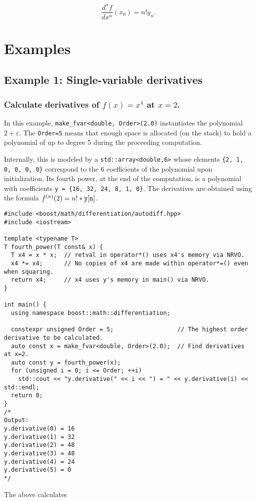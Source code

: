 \documentclass{article}
\begin{document}
\[ \frac{d^nf}{dx^n}(x_0)=n!y_n. \]

\section{Examples}

\subsection{Example 1: Single-variable derivatives}

\subsubsection{Calculate derivatives of $f(x)=x^4$ at $x=2$.}

In this example, {\tt make\_fvar<double, Order>(2.0)} instantiates the polynomial $2+\varepsilon$. The {\tt Order=5}
means that enough space is allocated (on the stack) to hold a polynomial of up to degree 5 during the proceeding
computation.

Internally, this is modeled by a {\tt std::array<double,6>} whose elements {\tt \{2, 1, 0, 0, 0, 0\}} correspond
to the 6 coefficients of the polynomial upon initialization. Its fourth power, at the end of the computation, is
a polynomial with coefficients {\tt y = \{16, 32, 24, 8, 1, 0\}}.  The derivatives are obtained using the formula
$f^{(n)}(2)=n!*{\tt y[n]}$.

\begin{verbatim}
#include <boost/math/differentiation/autodiff.hpp>
#include <iostream>

template <typename T>
T fourth_power(T const& x) {
  T x4 = x * x;  // retval in operator*() uses x4's memory via NRVO.
  x4 *= x4;      // No copies of x4 are made within operator*=() even when squaring.
  return x4;     // x4 uses y's memory in main() via NRVO.
}

int main() {
  using namespace boost::math::differentiation;

  constexpr unsigned Order = 5;                  // The highest order derivative to be calculated.
  auto const x = make_fvar<double, Order>(2.0);  // Find derivatives at x=2.
  auto const y = fourth_power(x);
  for (unsigned i = 0; i <= Order; ++i)
    std::cout << "y.derivative(" << i << ") = " << y.derivative(i) << std::endl;
  return 0;
}
/*
Output:
y.derivative(0) = 16
y.derivative(1) = 32
y.derivative(2) = 48
y.derivative(3) = 48
y.derivative(4) = 24
y.derivative(5) = 0
*/
\end{verbatim}
The above calculates
\end{document}
